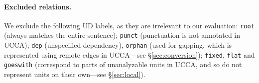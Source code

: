 \documentclass[11pt,a4paper]{article}
\begin{document}
\paragraph{Excluded relations.}
We exclude the following UD labels,
as they are irrelevant to our evaluation:
\texttt{root} (always matches the entire sentence);
\texttt{punct} (punctuation is not annotated in UCCA);
\texttt{dep} (unspecified dependency),
\texttt{orphan} (used for gapping, which is represented using remote edges in UCCA---see \S\ref{sec:conversion});
\texttt{fixed}, \texttt{flat} and \texttt{goeswith} (correspond to parts of unanalyzable units in UCCA,
    and so do not represent units on their own---see \S\ref{sec:local}).




\end{document}
